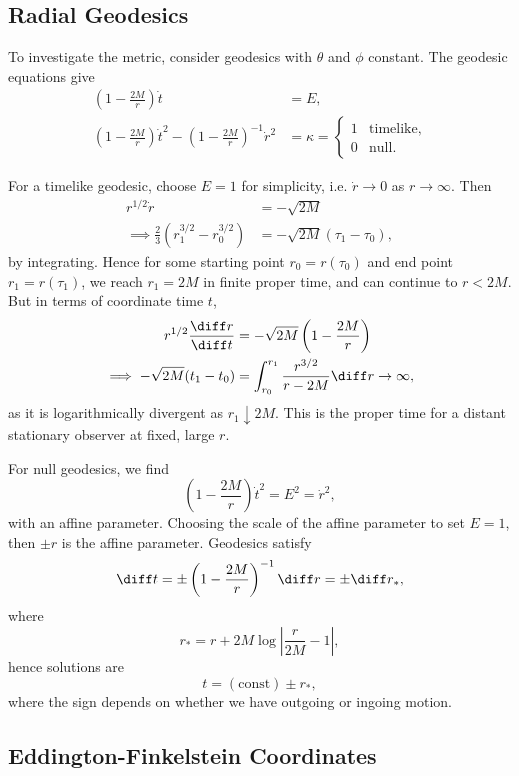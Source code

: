 \documentclass[12pt]{article}
\begin{document}
\subsection{Radial Geodesics}
\label{sub:rg}

To investigate the metric, consider geodesics with $\theta$ and $\phi$ constant. The geodesic equations give
\begin{align*}
	\left(1 - \frac{2M}{r} \right)\dot t &= E, \\
	\left(1 - \frac{2M}{r} \right) \dot t^2 - \left(1 - \frac{2M}{r} \right)^{-1} \dot r^2 &= \kappa =
	\begin{cases}
		1 & \text{timelike}, \\
		0 & \text{null}.
	\end{cases}
\end{align*}

For a timelike geodesic, choose $E = 1$ for simplicity, i.e. $\dot r \to 0$ as $r \to \infty$. Then
\begin{align*}
	r^{1/2} \dot r &= - \sqrt{2M} \\
	\implies \frac{2}{3}(r_1^{3/2} - r_0^{3/2}) &= - \sqrt{2M} (\tau_1- \tau_0),
\end{align*}
by integrating. Hence for some starting point $r_0 = r(\tau_0)$ and end point $r_1 = r(\tau_1)$, we reach $r_1 = 2M$ in finite proper time, and can continue to $r < 2M$. But in terms of coordinate time $t$,
\begin{align*}
	r^{1/2} \frac{\diff r}{\diff t} &= - \sqrt{2M} \left(1 - \frac{2M}{r} \right) \\
	\implies - \sqrt{2M}(t_1 - t_0) &= \int_{r_0}^{r_1} \frac{r^{3/2}}{r - 2M} \diff r \to \infty,
\end{align*}
as it is logarithmically divergent as $r_1 \downarrow 2M$. This is the proper time for a distant stationary observer at fixed, large $r$.

For null geodesics, we find
\[
\left(1 - \frac{2M}{r} \right) \dot t^2 = E^2 = \dot r^2,
\]
with an affine parameter. Choosing the scale of the affine parameter to set $E = 1$, then $\pm r$ is the affine parameter. Geodesics satisfy
\[
\diff t = \pm \left(1 - \frac{2M}{r} \right)^{-1} \diff r = \pm \diff r_\ast,
\]
where
\[
r_\ast = r + 2M \log \left| \frac{r}{2M} - 1 \right|,
\]
hence solutions are
\[
	t = (\text{const}) \pm r_\ast,
\]
where the sign depends on whether we have outgoing or ingoing motion.

\subsection{Eddington-Finkelstein Coordinates}
\label{sub:efc}
\end{document}
